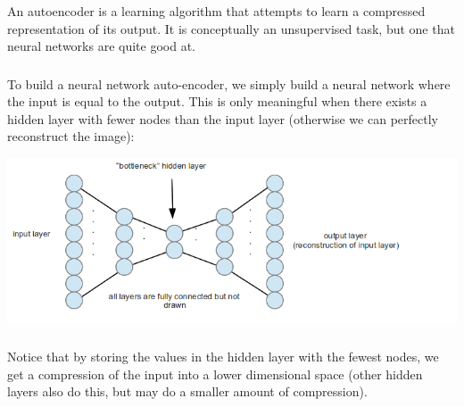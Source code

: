 \documentclass[xetex,mathserif,serif,aspectratio=169]{beamer}
\begin{document}
\begin{frame}[fragile] \frametitle{} \oldB \small


An autoencoder is a learning algorithm that attempts to
learn a compressed representation of its output. It is
conceptually an unsupervised task, but one that neural
networks are quite good at.

\end{frame}

\begin{frame}[fragile] \frametitle{} \oldB \small


To build a neural network auto-encoder, we simply build a neural
network where the input is equal to the output. This is only meaningful
when there exists a hidden layer with fewer nodes than the input
layer (otherwise we can perfectly reconstruct the image):

\begin{center}
\includegraphics[height=0.5\textheight]{img/autoencoder_network1.png}
\end{center}

\end{frame}

\begin{frame}[fragile] \frametitle{} \oldB \small


Notice that by storing the values in the hidden layer with
the fewest nodes, we get a compression of the input into a
lower dimensional space (other hidden layers also do this, but
may do a smaller amount of compression).

\end{frame}
\end{document}
